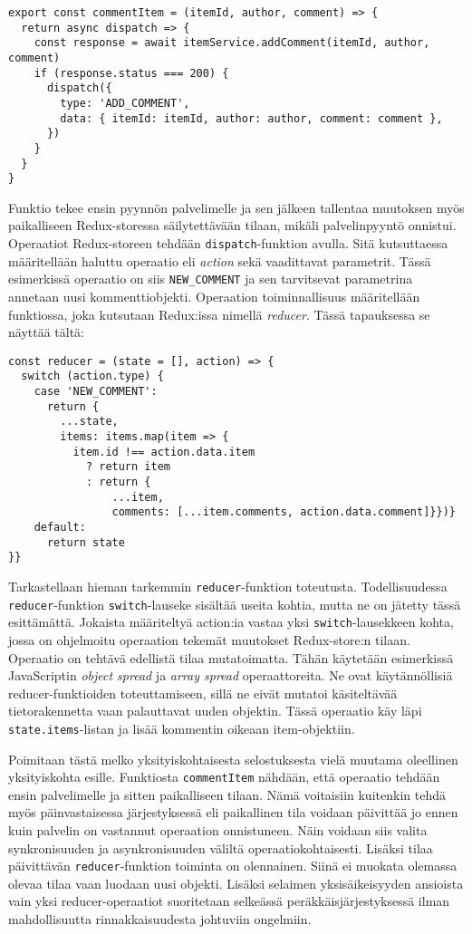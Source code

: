 \documentclass[finnish,twoside,censored,csm,sw-track-2018]{HYthesisML}
\begin{document}
\begin{Verbatim}[fontsize=\footnotesize]
export const commentItem = (itemId, author, comment) => {
  return async dispatch => {
    const response = await itemService.addComment(itemId, author, comment)
    if (response.status === 200) {
      dispatch({
        type: 'ADD_COMMENT',
        data: { itemId: itemId, author: author, comment: comment },
      })
    }
  }
}
\end{Verbatim}

Funktio tekee ensin pyynnön palvelimelle ja sen jälkeen tallentaa muutoksen myös paikalliseen Redux-storessa säilytettävään tilaan, mikäli palvelinpyyntö onnistui. Operaatiot Redux-storeen tehdään \verb+dispatch+-funktion avulla. Sitä kutsuttaessa määritellään haluttu operaatio eli \textit{action} sekä vaadittavat parametrit. Tässä esimerkissä operaatio on siis \verb+NEW_COMMENT+ ja sen tarvitsevat parametrina annetaan uusi kommenttiobjekti. Operaation toiminnallisuus määritellään funktiossa, joka kutsutaan Redux:issa nimellä \textit{reducer}. Tässä tapauksessa se näyttää tältä:

\begin{Verbatim}[fontsize=\footnotesize]
const reducer = (state = [], action) => {
  switch (action.type) {
    case 'NEW_COMMENT':
      return {
        ...state,
        items: items.map(item => {
          item.id !== action.data.item
            ? return item
            : return {
                ...item,
                comments: [...item.comments, action.data.comment]}})}
    default:
      return state
}}
\end{Verbatim}

Tarkastellaan hieman tarkemmin \verb+reducer+-funktion toteutusta. Todellisuudessa \verb+reducer+-funktion \verb+switch+-lauseke sisältää useita kohtia, mutta ne on jätetty tässä esittämättä. Jokaista määriteltyä action:ia vastaa yksi \verb+switch+-lausekkeen kohta, jossa on ohjelmoitu operaation tekemät muutokset Redux-store:n tilaan. Operaatio on tehtävä edellistä tilaa mutatoimatta. Tähän käytetään esimerkissä JavaScriptin \textit{object spread} ja \textit{array spread} operaattoreita. Ne ovat käytännöllisiä reducer-funktioiden toteuttamiseen, sillä ne eivät mutatoi käsiteltävää tietorakennetta vaan palauttavat uuden objektin. Tässä operaatio käy läpi \verb+state.items+-listan ja lisää kommentin oikeaan item-objektiin.

Poimitaan tästä melko yksityiskohtaisesta selostuksesta vielä muutama oleellinen yksityiskohta esille. Funktiosta \verb+commentItem+ nähdään, että operaatio tehdään ensin palvelimelle ja sitten paikalliseen tilaan. Nämä voitaisiin kuitenkin tehdä myös päinvastaisessa järjestyksessä eli paikallinen tila voidaan päivittää jo ennen kuin palvelin on vastannut operaation onnistuneen. Näin voidaan siis valita synkronisuuden ja asynkronisuuden väliltä operaatiokohtaisesti. Lisäksi tilaa päivittävän \verb+reducer+-funktion toiminta on olennainen. Siinä ei muokata olemassa olevaa tilaa vaan luodaan uusi objekti. Lisäksi selaimen yksisäikeisyyden ansioista vain yksi reducer-operaatiot suoritetaan selkeässä peräkkäisjärjes\-tyksessä ilman mahdollisuutta rinnakkaisuudesta johtuviin ongelmiin.
\end{document}

